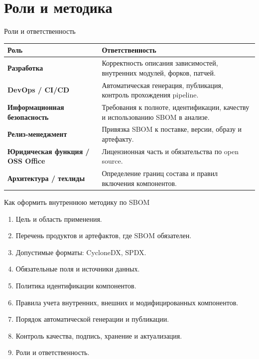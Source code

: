 \documentclass[aspectratio=169,10pt]{beamer}
\begin{document}
\section{Роли и методика}

\begin{frame}{Роли и ответственность}
\begin{table}
\scriptsize
\begin{tabularx}{\textwidth}{>{\bfseries}p{3cm}Y}
\toprule
Роль & Ответственность \\
\midrule
Разработка & Корректность описания зависимостей, внутренних модулей, форков, патчей. \\
DevOps / CI/CD & Автоматическая генерация, публикация, контроль прохождения pipeline. \\
Информационная безопасность & Требования к полноте, идентификации, качеству и использованию SBOM в анализе. \\
Релиз-менеджмент & Привязка SBOM к поставке, версии, образу и артефакту. \\
Юридическая функция / OSS Office & Лицензионная часть и обязательства по open source. \\
Архитектура / техлиды & Определение границ состава и правил включения компонентов. \\
\bottomrule
\end{tabularx}
\end{table}
\end{frame}

\begin{frame}{Как оформить внутреннюю методику по SBOM}
\begin{enumerate}
  \item Цель и область применения.
  \item Перечень продуктов и артефактов, где SBOM обязателен.
  \item Допустимые форматы: CycloneDX, SPDX.
  \item Обязательные поля и источники данных.
  \item Политика идентификации компонентов.
  \item Правила учета внутренних, внешних и модифицированных компонентов.
  \item Порядок автоматической генерации и публикации.
  \item Контроль качества, подпись, хранение и актуализация.
  \item Роли и ответственность.
\end{enumerate}
\end{frame}
\end{document}
